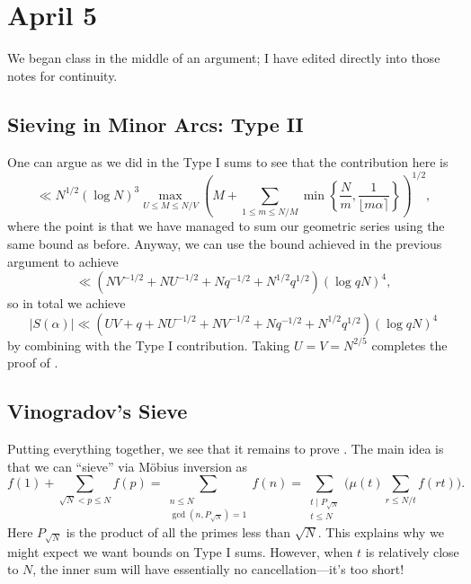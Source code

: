 \documentclass[../notes.tex]{subfiles}
\begin{document}
\section{April 5}

We began class in the middle of an argument; I have edited directly into those notes for continuity.

\subsection{Sieving in Minor Arcs: Type II}
One can argue as we did in the Type I sums to see that the contribution here is
\[\ll N^{1/2}(\log N)^3\max_{U\le M\le N/V}\left(M+\sum_{1\le m\le N/M}\min\left\{\frac Nm,\frac1{\lfloor m\alpha\rceil}\right\}\right)^{1/2},\]
where the point is that we have managed to sum our geometric series using the same bound as before. Anyway, we can use the bound achieved in the previous argument to achieve
\[\ll\left(NV^{-1/2}+NU^{-1/2}+Nq^{-1/2}+N^{1/2}q^{1/2}\right)(\log qN)^4,\]
so in total we achieve
\[|S(\alpha)|\ll\left(UV+q+NU^{-1/2}+NV^{-1/2}+Nq^{-1/2}+N^{1/2}q^{1/2}\right)(\log qN)^4\]
by combining with the Type I contribution. Taking $U=V=N^{2/5}$ completes the proof of .

\subsection{Vinogradov's Sieve}
Putting everything together, we see that it remains to prove . The main idea is that we can ``sieve'' via M\"obius inversion as
\[f(1)+\sum_{\sqrt N<p\le N}f(p)=\sum_{\substack{n\le N\\\gcd(n,P_{\sqrt N})=1}}f(n)=\sum_{\substack{t\mid P_{\sqrt N}\\t\le N}}\Bigg(\mu(t)\sum_{r\le N/t}f(rt)\Bigg).\]
Here $P_{\sqrt N}$ is the product of all the primes less than $\sqrt N$. This explains why we might expect we want bounds on Type I sums. However, when $t$ is relatively close to $N$, the inner sum will have essentially no cancellation---it's too short!
\end{document}
